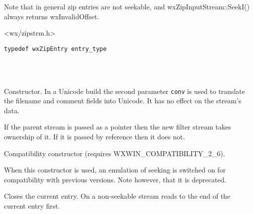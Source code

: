 Note that in general zip entries are not seekable, and
wxZipInputStream::SeekI() always returns wxInvalidOffset.




<wx/zipstrm.h>

\begin{verbatim}
typedef wxZipEntry entry_type
\end{verbatim}


\\
\\



\label{wxzipinputstreamwxzipinputstream}



Constructor. In a Unicode build the second parameter {\tt conv} is
used to translate the filename and comment fields into Unicode. It has
no effect on the stream's data.

If the parent stream is passed as a pointer then the new filter stream
takes ownership of it. If it is passed by reference then it does not.


Compatibility constructor (requires WXWIN\_COMPATIBILITY\_2\_6).

When this constructor is used, an emulation of seeking is
switched on for compatibility with previous versions. Note however,
that it is deprecated.


\label{wxzipinputstreamcloseentry}


Closes the current entry. On a non-seekable stream reads to the end of
the current entry first.


